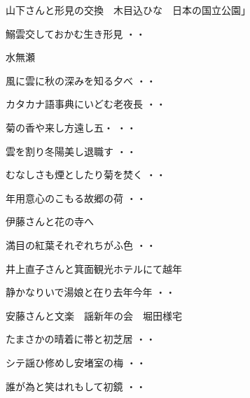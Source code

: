 \vspace{0.6cm}
山下さんと形見の交換　木目込ひな　日本の国立公園」
\begin{shiika}鰯雲交しておかむ生き形見
\hfill{・・}\end{shiika}
\vspace{0.6cm}
水無瀬
\begin{shiika}風に雲に秋の深みを知る夕べ
\hfill{・・}\end{shiika}
\begin{shiika}カタカナ語事典にいどむ老夜長
\hfill{・・}\end{shiika}
\begin{shiika}菊の香や来し方遠し五・
\hfill{・・}\end{shiika}
\begin{shiika}雲を割り冬陽美し退職す
\hfill{・・}\end{shiika}
\begin{shiika}むなしさも煙としたり菊を焚く
\hfill{・・}\end{shiika}
\begin{shiika}年用意心のこもる故郷の荷
\hfill{・・}\end{shiika}
\vspace{0.6cm}
伊藤さんと花の寺へ
\begin{shiika}満目の紅葉それぞれちがふ色
\hfill{・・}\end{shiika}
\vspace{0.6cm}
井上直子さんと箕面観光ホテルにて越年
\begin{shiika}静かなりいで湯娘と在り去年今年
\hfill{・・}\end{shiika}
\vspace{0.6cm}
安藤さんと文楽　謡新年の会　堀田様宅
\begin{shiika}たまさかの晴着に帯と初芝居
\hfill{・・}\end{shiika}
\begin{shiika}シテ謡ひ修めし安堵室の梅
\hfill{・・}\end{shiika}
\begin{shiika}誰が為と笑はれもして初鏡
\hfill{・・}\end{shiika}
